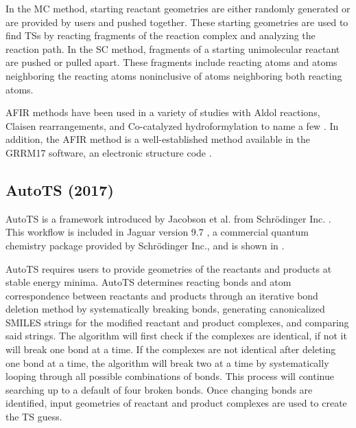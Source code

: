 \documentclass[preprint, 11pt]{elsarticle} %
\begin{document}
In the MC method, starting reactant geometries are either randomly generated or are provided by users and pushed together.
These starting geometries are used to find TSs by reacting fragments of the reaction complex and analyzing the reaction path.
In the SC method, fragments of a starting unimolecular reactant are pushed or pulled apart. 
These fragments include reacting atoms and atoms neighboring the reacting atoms noninclusive of atoms neighboring both reacting atoms.

AFIR methods have been used in a variety of studies \cite{Maeda:2016, Madea:2018} with Aldol reactions, Claisen rearrangements, and Co-catalyzed hydroformylation to name a few \cite{Maeda:2016}.
In addition, the AFIR method is a well-established method available in the GRRM17 software, an electronic structure code \cite{Madea:2013}.



\subsection{AutoTS (2017)}

AutoTS is a framework introduced by Jacobson et al. from Schr\"{o}dinger Inc. \cite{jacobson:2017}. 
This workflow is included in Jaguar version 9.7 \cite{Jaguar:2013},  a commercial quantum chemistry package provided by Schr\"{o}dinger Inc., and is shown in .

AutoTS requires users to provide geometries of the reactants and products at stable energy minima.
AutoTS determines reacting bonds and atom correspondence between reactants and products through an iterative bond deletion method by systematically breaking bonds, generating canonicalized SMILES strings for the modified reactant and product complexes, and comparing said strings.
The algorithm will first check if the complexes are identical, if not it will break one bond at a time.
If the complexes are not identical after deleting one bond at a time, the algorithm will break two at a time by systematically looping through all possible combinations of bonds.
This process will continue searching up to a default of four broken bonds.
Once changing bonds are identified, input geometries of reactant and product complexes are used to create the TS guess.
\end{document}
